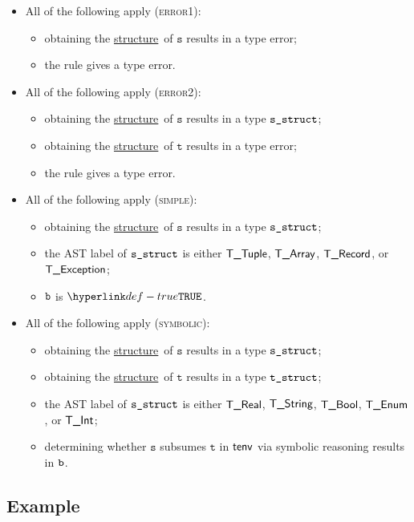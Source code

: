 \documentclass{book}
\newcommand\structure[0]{\hyperlink{def-structure}{structure}}
\newcommand\vt[0]{\texttt{t}}
\newcommand\vs[0]{\texttt{s}}
\begin{document}
\begin{itemize}
  \item All of the following apply (\textsc{error1}):
  \begin{itemize}
    \item obtaining the \structure\ of $\vs$ results in a type error;
    \item the rule gives a type error.
  \end{itemize}

  \item All of the following apply (\textsc{error2}):
  \begin{itemize}
    \item obtaining the \structure\ of $\vs$ results in a type $\texttt{s\_struct}$;
    \item obtaining the \structure\ of $\vt$ results in a type error;
    \item the rule gives a type error.
  \end{itemize}

  \item All of the following apply (\textsc{simple}):
  \begin{itemize}
    \item obtaining the \structure\ of $\vs$ results in a type $\texttt{s\_struct}$;
    \item the AST label of $\texttt{s\_struct}$ is either $\textsf{T\_Tuple}$, $\textsf{T\_Array}$, $\textsf{T\_Record}$, or $\textsf{T\_Exception}$;
    \item $\texttt{b}$ is $\True$.
  \end{itemize}

  \item All of the following apply (\textsc{symbolic}):
  \begin{itemize}
    \item obtaining the \structure\ of $\vs$ results in a type $\texttt{s\_struct}$;
    \item obtaining the \structure\ of $\vt$ results in a type $\texttt{t\_struct}$;
    \item the AST label of $\texttt{s\_struct}$ is either $\textsf{T\_Real}$, $\textsf{T\_String}$, $\textsf{T\_Bool}$, $\textsf{T\_Enum}$, or $\textsf{T\_Int}$;
    \item determining whether $\vs$ subsumes $\vt$ in $\textsf{tenv}$ via symbolic reasoning results in $\texttt{b}$.
  \end{itemize}
\end{itemize}

\subsection{Example}
\end{document}
